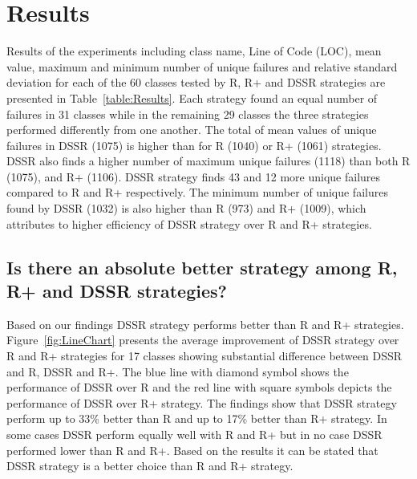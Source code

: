\documentclass[conference]{IEEEtran}
\begin{document}
\section{Results}\label{sec:res}
Results of the experiments including class name, Line of Code (LOC), mean value, maximum and minimum number of unique failures and relative standard deviation for each of the 60 classes tested by R, R+ and DSSR strategies are presented in Table~\ref{table:Results}. Each strategy found an equal number of failures in 31 classes while in the remaining 29 classes the three strategies performed differently from one another. The total of mean values of unique failures in DSSR (1075) is higher than for R (1040) or R+ (1061) strategies. 
DSSR also finds a higher number of maximum unique failures (1118) than both R (1075), and R+ (1106). DSSR strategy finds 43 and 12 more unique failures compared to R and R+ respectively. The minimum number of unique failures found by DSSR (1032) is also higher than R (973) and R+ (1009), which attributes to higher efficiency of DSSR strategy over R and R+ strategies. 


\subsection{Is there an absolute better strategy among R, R+ and DSSR strategies?}
Based on our findings DSSR strategy performs better than R and R+ strategies.  Figure~\ref{fig:LineChart} presents the average improvement of DSSR strategy over R and R+ strategies for 17 classes showing substantial difference between DSSR and R, DSSR and R+. The blue line with diamond symbol shows the performance of DSSR over R and the red line with square symbols depicts the performance of DSSR over R+ strategy. The findings show that DSSR strategy perform up to 33\% better than R and up to 17\% better than R+ strategy. In some cases DSSR perform equally well with R and R+ but in no case DSSR performed lower than R and R+. Based on the results it can be stated that DSSR strategy is a better choice than R and R+ strategy. %

\end{document}
